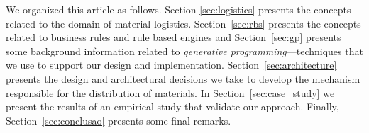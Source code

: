 We organized this article as follows. Section \ref{sec:logistics} presents the concepts 
related to the domain of material logistics. Section~\ref{sec:rbs} presents the concepts 
related to business rules and rule based engines and Section~\ref{sec:gp} presents some 
background information related to \emph{generative programming}---techniques that we use to support our 
design and implementation. Section~\ref{sec:architecture} presents the design and architectural decisions we take 
to develop the mechanism responsible for the distribution of materials. In Section~\ref{sec:case_study} we present the 
results of an empirical study that validate our approach. Finally, Section~\ref{sec:conclusao} presents some final 
remarks. 

